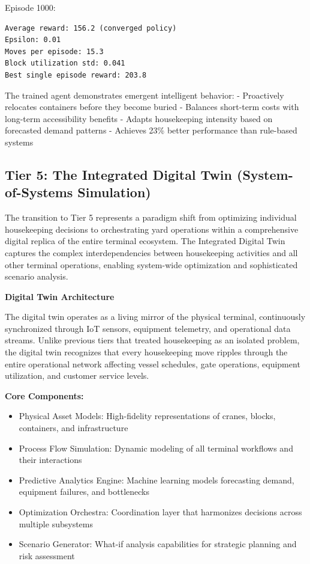 \documentclass{article}
\begin{document}
Episode 1000:
\begin{verbatim}
Average reward: 156.2 (converged policy)
Epsilon: 0.01
Moves per episode: 15.3
Block utilization std: 0.041
Best single episode reward: 203.8
\end{verbatim}

The trained agent demonstrates emergent intelligent behavior:
- Proactively relocates containers before they become buried
- Balances short-term costs with long-term accessibility benefits  
- Adapts housekeeping intensity based on forecasted demand patterns
- Achieves 23\% better performance than rule-based systems

\subsection{Tier 5: The Integrated Digital Twin (System-of-Systems Simulation)}

The transition to Tier 5 represents a paradigm shift from optimizing individual housekeeping decisions to orchestrating yard operations within a comprehensive digital replica of the entire terminal ecosystem. The Integrated Digital Twin captures the complex interdependencies between housekeeping activities and all other terminal operations, enabling system-wide optimization and sophisticated scenario analysis.

\textbf{Digital Twin Architecture}

The digital twin operates as a living mirror of the physical terminal, continuously synchronized through IoT sensors, equipment telemetry, and operational data streams. Unlike previous tiers that treated housekeeping as an isolated problem, the digital twin recognizes that every housekeeping move ripples through the entire operational network affecting vessel schedules, gate operations, equipment utilization, and customer service levels.

\textbf{Core Components:}
\begin{itemize}
\item Physical Asset Models: High-fidelity representations of cranes, blocks, containers, and infrastructure
\item Process Flow Simulation: Dynamic modeling of all terminal workflows and their interactions
\item Predictive Analytics Engine: Machine learning models forecasting demand, equipment failures, and bottlenecks
\item Optimization Orchestra: Coordination layer that harmonizes decisions across multiple subsystems
\item Scenario Generator: What-if analysis capabilities for strategic planning and risk assessment
\end{itemize}
\end{document}
